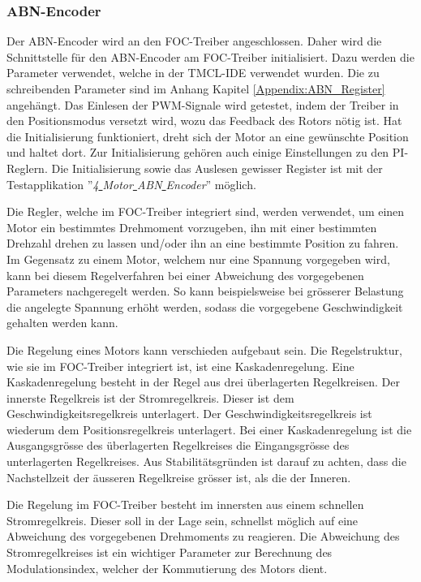\subsubsection{ABN-Encoder}
\label{subsubsec:Inbetriebnahme_ABN-Encoder}

Der ABN-Encoder wird an den FOC-Treiber angeschlossen. Daher wird die Schnittstelle für den ABN-Encoder am FOC-Treiber initialisiert. Dazu werden die Parameter verwendet, welche in der TMCL-IDE verwendet wurden. Die zu schreibenden Parameter sind im Anhang Kapitel \ref{Appendix:ABN_Register} angehängt. Das Einlesen der PWM-Signale wird getestet, indem der Treiber in den Positionsmodus versetzt wird, wozu das Feedback des Rotors nötig ist. Hat die Initialisierung funktioniert, dreht sich der Motor an eine gewünschte Position und haltet dort. Zur Initialisierung gehören auch einige Einstellungen zu den PI-Reglern. Die Initialisierung sowie das Auslesen gewisser Register ist mit der Testapplikation ''\textit{4\underline{ }Motor\underline{ }ABN\underline{ }Encoder}'' möglich.

Die Regler, welche im FOC-Treiber integriert sind, werden verwendet, um einen Motor ein bestimmtes Drehmoment vorzugeben, ihn mit einer bestimmten Drehzahl drehen zu lassen und/oder ihn an eine bestimmte Position zu fahren. Im Gegensatz zu einem Motor, welchem nur eine Spannung vorgegeben wird, kann bei diesem Regelverfahren bei einer Abweichung des vorgegebenen Parameters nachgeregelt werden. So kann beispielsweise bei grösserer Belastung die angelegte Spannung erhöht werden, sodass die vorgegebene Geschwindigkeit gehalten werden kann.

Die Regelung eines Motors kann verschieden aufgebaut sein. Die Regelstruktur, wie sie im FOC-Treiber integriert ist, ist eine Kaskadenregelung. Eine Kaskadenregelung besteht in der Regel aus drei überlagerten Regelkreisen. Der innerste Regelkreis ist der Stromregelkreis. Dieser ist dem Geschwindigkeitsregelkreis unterlagert. Der Geschwindigkeitsregelkreis ist wiederum dem Positionsregelkreis unterlagert. Bei einer Kaskadenregelung ist die Ausgangsgrösse des überlagerten Regelkreises die Eingangsgrösse des unterlagerten Regelkreises. Aus Stabilitätsgründen ist darauf zu achten, dass die Nachstellzeit der äusseren Regelkreise grösser ist, als die der Inneren.


Die Regelung im FOC-Treiber besteht im innersten aus einem schnellen Stromregelkreis. Dieser soll in der Lage sein, schnellst möglich auf eine Abweichung des vorgegebenen Drehmoments zu reagieren. Die Abweichung des Stromregelkreises ist ein wichtiger Parameter zur Berechnung des Modulationsindex, welcher der Kommutierung des Motors dient.

